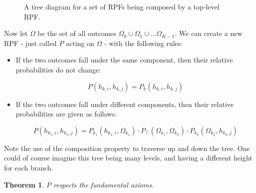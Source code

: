 \documentclass[twoside]{article}
\theoremstyle{plain}%
\newtheorem{theorem}{Theorem}[section]
\theoremstyle{definition}
\theoremstyle{remark}
\begin{document}
\begin{figure}[h]
\caption{A tree diagram for a set of RPFs being composed by a top-level RPF.}
\label{fig:compose_rpfs}
\end{figure}

Now let \(\Omega\) be the set of all outcomes \(\Omega_0 \cup \Omega_1 \cup \dots \Omega_{K-1}\). We can create a new RPF - just called \(P\) acting on \(\Omega\) - with the following rules:

\begin{itemize}
\item If the two outcomes fall under the same component, then their relative probabilities do not change:

\begin{equation}
\label{rpf_composition_same_branch}
P(h_{k, i}, h_{k, j}) = P_k(h_{k, i}, h_{k, j})
\end{equation}

\item If the two outcomes fall under different components, then their relative probabilities are given as follows.

\begin{equation}
\label{eq:rpf_composition_different_branch}
P(h_{k_1, i}, h_{k_2, j}) = P_{k_1}(h_{k_1, i}, \Omega_{k_1}) \cdot  P_{\top}(\Omega_{k_1}, \Omega_{k_2}) \cdot P_{k_2}(\Omega_{k_2}, h_{k_2, j})
\end{equation}
\end{itemize}

Note the use of the composition property to traverse up and down the tree. One could of course imagine this tree being many levels, and having a different height for each branch.

\begin{theorem}
\(P\) respects the fundamental axioms.
\end{theorem}
\end{document}
